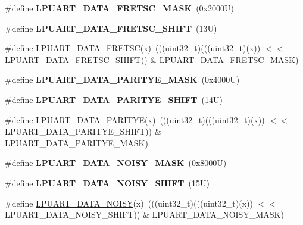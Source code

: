 \begin{DoxyCompactItemize}
\item 
\mbox{\label{group___l_p_u_a_r_t___register___masks_gaec861bf8fd8b652b7335960c3f1d7a9c}} 
\#define {\bfseries L\+P\+U\+A\+R\+T\+\_\+\+D\+A\+T\+A\+\_\+\+F\+R\+E\+T\+S\+C\+\_\+\+M\+A\+SK}~(0x2000\+U)
\item 
\mbox{\label{group___l_p_u_a_r_t___register___masks_ga140bec417a454b685efa23e67c1ce980}} 
\#define {\bfseries L\+P\+U\+A\+R\+T\+\_\+\+D\+A\+T\+A\+\_\+\+F\+R\+E\+T\+S\+C\+\_\+\+S\+H\+I\+FT}~(13\+U)
\item 
\#define \mbox{\hyperlink{group___l_p_u_a_r_t___register___masks_gaca984b728eac675619bc7e6da1314cda}{L\+P\+U\+A\+R\+T\+\_\+\+D\+A\+T\+A\+\_\+\+F\+R\+E\+T\+SC}}(x)~(((uint32\+\_\+t)(((uint32\+\_\+t)(x)) $<$$<$ L\+P\+U\+A\+R\+T\+\_\+\+D\+A\+T\+A\+\_\+\+F\+R\+E\+T\+S\+C\+\_\+\+S\+H\+I\+FT)) \& L\+P\+U\+A\+R\+T\+\_\+\+D\+A\+T\+A\+\_\+\+F\+R\+E\+T\+S\+C\+\_\+\+M\+A\+SK)
\item 
\mbox{\label{group___l_p_u_a_r_t___register___masks_ga5477bfe4a443b8cd93875e96caafe27f}} 
\#define {\bfseries L\+P\+U\+A\+R\+T\+\_\+\+D\+A\+T\+A\+\_\+\+P\+A\+R\+I\+T\+Y\+E\+\_\+\+M\+A\+SK}~(0x4000\+U)
\item 
\mbox{\label{group___l_p_u_a_r_t___register___masks_ga3641e0b7e8378d31923614fdb5ee2603}} 
\#define {\bfseries L\+P\+U\+A\+R\+T\+\_\+\+D\+A\+T\+A\+\_\+\+P\+A\+R\+I\+T\+Y\+E\+\_\+\+S\+H\+I\+FT}~(14\+U)
\item 
\#define \mbox{\hyperlink{group___l_p_u_a_r_t___register___masks_ga423f5a9fce85bbdd9d9b078dd1c081c0}{L\+P\+U\+A\+R\+T\+\_\+\+D\+A\+T\+A\+\_\+\+P\+A\+R\+I\+T\+YE}}(x)~(((uint32\+\_\+t)(((uint32\+\_\+t)(x)) $<$$<$ L\+P\+U\+A\+R\+T\+\_\+\+D\+A\+T\+A\+\_\+\+P\+A\+R\+I\+T\+Y\+E\+\_\+\+S\+H\+I\+FT)) \& L\+P\+U\+A\+R\+T\+\_\+\+D\+A\+T\+A\+\_\+\+P\+A\+R\+I\+T\+Y\+E\+\_\+\+M\+A\+SK)
\item 
\mbox{\label{group___l_p_u_a_r_t___register___masks_ga64d40d74a21260f67c0b3756313bdfba}} 
\#define {\bfseries L\+P\+U\+A\+R\+T\+\_\+\+D\+A\+T\+A\+\_\+\+N\+O\+I\+S\+Y\+\_\+\+M\+A\+SK}~(0x8000\+U)
\item 
\mbox{\label{group___l_p_u_a_r_t___register___masks_ga77c63374d5beaa88e7a049a4f9ef309e}} 
\#define {\bfseries L\+P\+U\+A\+R\+T\+\_\+\+D\+A\+T\+A\+\_\+\+N\+O\+I\+S\+Y\+\_\+\+S\+H\+I\+FT}~(15\+U)
\item 
\#define \mbox{\hyperlink{group___l_p_u_a_r_t___register___masks_gabcb9ae6791c4ece2a4b2c496f88c9d2a}{L\+P\+U\+A\+R\+T\+\_\+\+D\+A\+T\+A\+\_\+\+N\+O\+I\+SY}}(x)~(((uint32\+\_\+t)(((uint32\+\_\+t)(x)) $<$$<$ L\+P\+U\+A\+R\+T\+\_\+\+D\+A\+T\+A\+\_\+\+N\+O\+I\+S\+Y\+\_\+\+S\+H\+I\+FT)) \& L\+P\+U\+A\+R\+T\+\_\+\+D\+A\+T\+A\+\_\+\+N\+O\+I\+S\+Y\+\_\+\+M\+A\+SK)
\end{DoxyCompactItemize}
